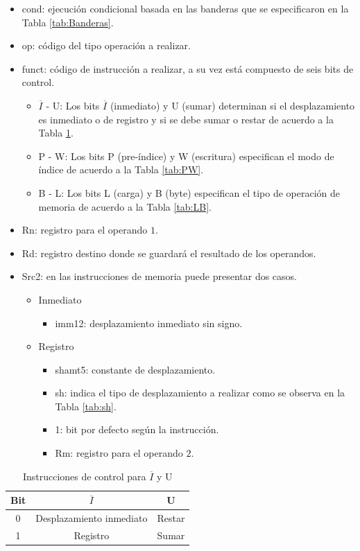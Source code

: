 \documentclass[journal,trans]{IEEEtran}
\begin{document}
	\begin{itemize}
		\item cond: ejecución condicional basada en las banderas que se especificaron en la Tabla \ref{tab:Banderas}.
		\item op: código del tipo operación a realizar.
		\item funct: código de instrucción a realizar, a su vez está compuesto de seis bits de control.
		\begin{itemize}
			\item $\overline{I}$ - U: Los bits $\overline{I}$ (inmediato) y U (sumar) determinan si el desplazamiento es inmediato o de registro y si se debe sumar o restar de acuerdo a la Tabla \ref{tab:IU}.
			\item P - W: Los bits P (pre-índice) y W (escritura) especifican el modo de índice de acuerdo a la Tabla \ref{tab:PW}.
			\item B - L: Los bits L (carga) y B (byte) especifican el tipo de operación de memoria de acuerdo a la Tabla \ref{tab:LB}.
		\end{itemize}
		\item Rn: registro para el operando $1$.
		\item Rd: registro destino donde se guardará el resultado de los operandos.
		\item Src2: en las instrucciones de memoria puede presentar dos casos.
		\begin{itemize}
			\item Inmediato
			\begin{itemize}
				\item imm12: desplazamiento inmediato sin signo.
			\end{itemize}
			\item Registro
			\begin{itemize}
				\item shamt5: constante de desplazamiento.
				\item sh: indica el tipo de desplazamiento a realizar como se observa en la Tabla \ref{tab:sh}.
				\item 1: bit por defecto según la instrucción.
				\item Rm: registro para el operando $2$.
			\end{itemize}
		\end{itemize}
	\end{itemize}
	
	\begin{table}[htbp]
		\centering
		\begin{tabular}{|c|c|c|}
			\hline
			Bit & $\overline{I}$           & U \\
			\hline
			\hline
			0   & Desplazamiento inmediato & Restar \\
			\hline
			1   & Registro                 & Sumar \\
			\hline
		\end{tabular}
		\caption{Instrucciones de control para $\overline{I}$ y U}
		\label{tab:IU}
	\end{table}
	
\end{document}
